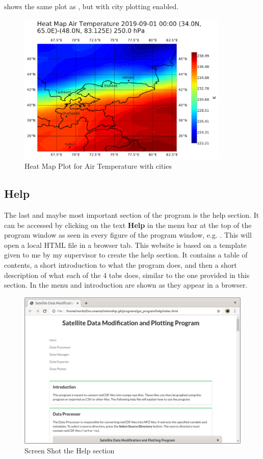 \documentclass[../00_main.tex]{subfiles}
\begin{document}
 shows the same plot as , but with city
plotting enabled.
\begin{figure}[h]
    \center
    \includegraphics[width=0.9\textwidth]{../graphics/plt03}
    \caption{Heat Map Plot for Air Temperature with cities}
    \label{plt:dpl03}
\end{figure}

\subsection{Help}

The last and maybe most important section of the program is the help section.
It can be accessed by clicking on the text \textbf{Help} in the menu bar at the
top of the program window as seen in every figure of the program window, e.g.
. This will open a local HTML file in a browser tab. This website
is based on a template given to me by my supervisor to create the help
section. It contains a table of contents, a short introduction to what the
program does, and then a short description of what each of the 4 tabs does,
similar to the one provided in this section. In  the menu and
introduction are shown as they appear in a browser.
\begin{figure}[H]
    \center
    \includegraphics[width=\textwidth]{../graphics/help}
    \caption{Screen Shot the Help section}
    \label{help}
\end{figure}
\end{document}
